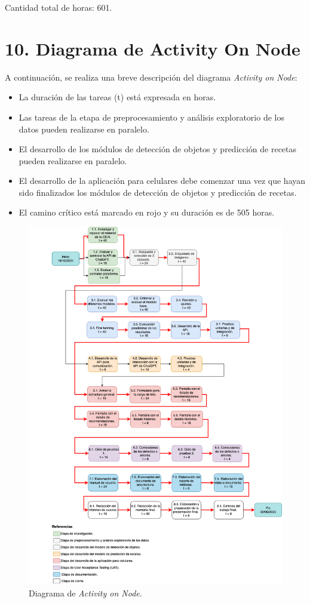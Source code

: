 \documentclass[
11pt, %
]{charter}
\begin{document}
Cantidad total de horas: 601.

\section{10. Diagrama de Activity On Node}
\label{sec:AoN}
A continuación, se realiza una breve descripción del diagrama \textit{Activity on Node}:

\begin{itemize}
\item La duración de las tareas (t) está expresada en horas.
\item Las tareas de la etapa de preprocesamiento y análisis exploratorio de los datos pueden realizarse en paralelo.
\item El desarrollo de los módulos de detección de objetos y predicción de recetas pueden realizarse en paralelo.
\item El desarrollo de la aplicación para celulares debe comenzar una vez que hayan sido finalizados los módulos de detección de objetos y predicción de recetas.
\item El camino crítico está marcado en rojo y su duración es de 505 horas.
\end{itemize}


\newpage

\begin{figure}[H]
\centering 
\includegraphics[width=1\textwidth]{./AoN.png}
\caption{Diagrama de \textit{Activity on Node}.}
\label{fig:AoN}
\end{figure}
\newpage
\end{document}
